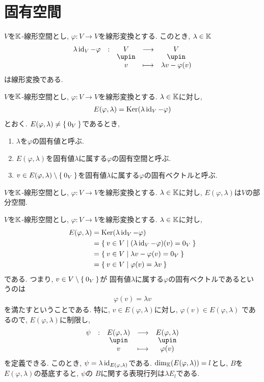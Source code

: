 \section{固有空間}

$V$を$\mathbb{K}$-線形空間とし,
$\varphi\colon V\to V$を線形変換とする.
このとき, $\lambda\in \mathbb{K}$
\begin{align*}
  \shazo{\lambda\id_V-\varphi}{V}{V}
  {v}{\lambda v-\varphi(v)}
\end{align*}
は線形変換である.
\begin{definition}
  $V$を$\mathbb{K}$-線形空間とし,
  $\varphi\colon V\to V$を線形変換とする.
  $\lambda \in \mathbb{K}$に対し,
  \begin{align*}
    E(\varphi,\lambda) = \operatorname{Ker}(\lambda\operatorname{id}_V-\varphi )
  \end{align*}
  とおく.
  $E(\varphi,\lambda)\neq \Set{0_V}$であるとき,
  \begin{enumerate}
  \item $\lambda$を$\varphi$の固有値と呼ぶ.
  \item $E(\varphi,\lambda)$を固有値$\lambda$に属する$\varphi$の固有空間と呼ぶ.
  \item $v\in E(\varphi,\lambda)\setminus\Set{0_V}$を固有値$\lambda$に属する$\varphi$の固有ベクトルと呼ぶ.
  \end{enumerate}
\end{definition}

\begin{remark}
  $V$を$\mathbb{K}$-線形空間とし,
  $\varphi\colon V\to V$を線形変換とする.
  $\lambda \in \mathbb{K}$に対し,
  $E(\varphi,\lambda)$は$V$の部分空間.
\end{remark}

\begin{remark}
  $V$を$\mathbb{K}$-線形空間とし,
  $\varphi\colon V\to V$を線形変換とする.
  $\lambda \in \mathbb{K}$に対し,
  \begin{align*}
    E(\varphi,\lambda) &= \operatorname{Ker}( \lambda\operatorname{id}_V - \varphi)\\
    &= \Set{v\in V|(\lambda\operatorname{id}_V-\varphi)(v)=0_V}\\
    &= \Set{v\in V|\lambda v-\varphi(v)  =0_V}\\
    &= \Set{v\in V|\varphi(v) = \lambda v }
  \end{align*}
  である.
  つまり, $v\in V\setminus\Set{0_V}$が
  固有値$\lambda$に属する$\varphi$の固有ベクトルであるというのは
  \begin{align*}
    \varphi(v)=\lambda v
  \end{align*}
  を満たすということである.
  特に, $v\in E(\varphi,\lambda)$に対し, $\varphi(v)\in E(\varphi,\lambda)$
  であるので,
  $E(\varphi,\lambda)$に制限し,
  \begin{align*}
    \shazo{\psi}{E(\varphi,\lambda)}{E(\varphi,\lambda)}
    {v}{\varphi(v)}
  \end{align*}
  を定義できる. 
  このとき, $\psi=\lambda \operatorname{id}_{E(\varphi,\lambda)}$である.
  $\dim_{\mathbb{K}}(E(\varphi,\lambda))=l$とし, $B$を
  $E(\varphi,\lambda)$の基底すると,
  $\psi$の
  $B$に関する表現行列は$\lambda E_l$である.
\end{remark}
  

